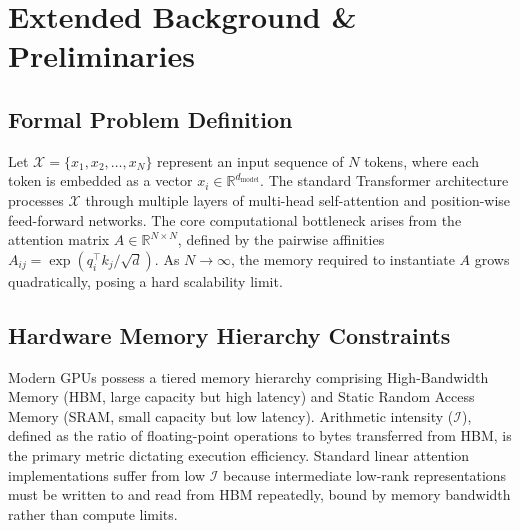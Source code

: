 \section{Extended Background \& Preliminaries}
\label{sec:background}

\subsection{Formal Problem Definition}
Let $\mathcal{X} = \{x_1, x_2, \dots, x_N\}$ represent an input sequence of $N$ tokens, where each token is embedded as a vector $x_i \in \mathbb{R}^{d_{\text{model}}}$. The standard Transformer architecture processes $\mathcal{X}$ through multiple layers of multi-head self-attention and position-wise feed-forward networks. The core computational bottleneck arises from the attention matrix $A \in \mathbb{R}^{N \times N}$, defined by the pairwise affinities $A_{ij} = \exp(q_i^\top k_j / \sqrt{d})$. As $N \to \infty$, the memory required to instantiate $A$ grows quadratically, posing a hard scalability limit.

\subsection{Hardware Memory Hierarchy Constraints}
Modern GPUs possess a tiered memory hierarchy comprising High-Bandwidth Memory (HBM, large capacity but high latency) and Static Random Access Memory (SRAM, small capacity but low latency). Arithmetic intensity ($\mathcal{I}$), defined as the ratio of floating-point operations to bytes transferred from HBM, is the primary metric dictating execution efficiency. Standard linear attention implementations suffer from low $\mathcal{I}$ because intermediate low-rank representations must be written to and read from HBM repeatedly, bound by memory bandwidth rather than compute limits.

